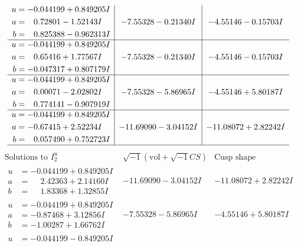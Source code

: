 \documentclass[1p]{elsarticle_modified}
\theoremstyle{definition}
\newcommand{\I}{\sqrt{-1}}
\begin{document}
$$\begin{array}{c|c|c}
\begin{aligned}
u &= -0.044199 + 0.849205 I \\
a &= \phantom{-}0.72801 - 1.52143 I \\
b &= \phantom{-}0.825388 - 0.962313 I\end{aligned}
 & -7.55328 - 0.21340 I & -4.55146 - 0.15703 I \\ \hline\begin{aligned}
u &= -0.044199 + 0.849205 I \\
a &= \phantom{-}0.65416 + 1.77567 I \\
b &= -0.047317 + 0.807179 I\end{aligned}
 & -7.55328 - 0.21340 I & -4.55146 - 0.15703 I \\ \hline\begin{aligned}
u &= -0.044199 + 0.849205 I \\
a &= \phantom{-}0.00071 - 2.02802 I \\
b &= \phantom{-}0.774141 - 0.907919 I\end{aligned}
 & -7.55328 - 5.86965 I & -4.55146 + 5.80187 I \\ \hline\begin{aligned}
u &= -0.044199 + 0.849205 I \\
a &= -0.67415 + 2.52234 I \\
b &= \phantom{-}0.057490 + 0.752723 I\end{aligned}
 & -11.69090 - 3.04152 I & -11.08072 + 2.82242 I\\
 \hline 
 \end{array}$$\newpage$$\begin{array}{c|c|c}  
\text{Solutions to }I^u_{2}& \I (\text{vol} + \sqrt{-1}CS) & \text{Cusp shape}\\
 \hline 
\begin{aligned}
u &= -0.044199 + 0.849205 I \\
a &= \phantom{-}2.42363 + 2.14160 I \\
b &= \phantom{-}1.83368 + 1.32855 I\end{aligned}
 & -11.69090 - 3.04152 I & -11.08072 + 2.82242 I \\ \hline\begin{aligned}
u &= -0.044199 + 0.849205 I \\
a &= -0.87468 + 3.12856 I \\
b &= -1.00287 + 1.66762 I\end{aligned}
 & -7.55328 - 5.86965 I & -4.55146 + 5.80187 I \\ \hline\begin{aligned}
u &= -0.044199 - 0.849205 I \\

\end{aligned}
\end{array}$$
\end{document}
